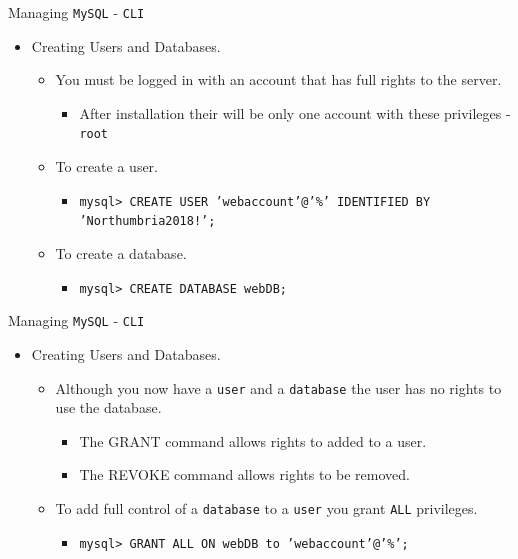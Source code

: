 \documentclass[xcolor=table,aspectratio=169]{beamer}
\begin{document}
\begin{frame}{Managing \texttt{MySQL} - \texttt{CLI}}
  \begin{itemize}
    \item Creating Users and Databases.
      \begin{itemize}
        \item You must be logged in with an account that has full rights to the server.
          \begin{itemize}
            \item After installation their will be only one account with these privileges - \texttt{root}
          \end{itemize}
        \item To create a user.
          \begin{itemize}
            \item \texttt{mysql> CREATE USER 'webaccount'@'\%' IDENTIFIED BY 'Northumbria2018!';}
          \end{itemize}
        \item To create a database.
          \begin{itemize}
            \item \texttt{mysql> CREATE DATABASE webDB;}
          \end{itemize}
      \end{itemize}
  \end{itemize}
\end{frame}

\begin{frame}{Managing \texttt{MySQL} - \texttt{CLI}}
  \begin{itemize}
    \item Creating Users and Databases.
      \begin{itemize}
        \item Although you now have a \texttt{user} and a \texttt{database} the user has no rights to use the database.
          \begin{itemize}
            \item The GRANT command allows rights to added to a user.
            \item The REVOKE command allows rights to be removed.
          \end{itemize}
        \item To add full control of a \texttt{database} to a \texttt{user} you grant \texttt{ALL} privileges.
          \begin{itemize}
            \item \texttt{mysql> GRANT ALL ON webDB to 'webaccount'@'\%';}
          \end{itemize}
      \end{itemize}
  \end{itemize}
\end{frame}
\end{document}
